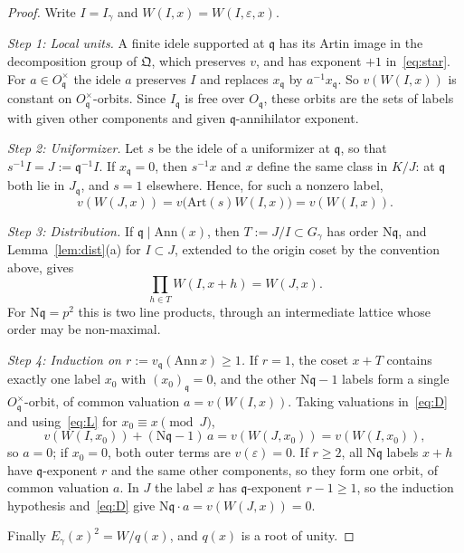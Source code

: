 \documentclass[11pt]{amsart}
\numberwithin{equation}{section}
\theoremstyle{plain}
\theoremstyle{definition}
\theoremstyle{remark}
\begin{document}
\begin{proof}
Write \(I=I_\gamma\) and \(W(I,x)=W(I,\varepsilon,x)\).

\emph{Step 1: Local units.} A finite idele supported at \(\mathfrak q\) has its Artin image in the decomposition group of \(\mathfrak Q\), which preserves \(v\), and has exponent \(+1\) in~\eqref{eq:star}. For \(a\in O_{\mathfrak q}^\times\) the idele \(a\) preserves \(I\) and replaces \(x_{\mathfrak q}\) by \(a^{-1}x_{\mathfrak q}\). So \(v(W(I,x))\) is constant on \(O_{\mathfrak q}^\times\)-orbits. Since \(I_{\mathfrak q}\) is free over \(O_{\mathfrak q}\), these orbits are the sets of labels with given other components and given \(\mathfrak q\)-annihilator exponent.

\emph{Step 2: Uniformizer.} Let \(s\) be the idele of a uniformizer at \(\mathfrak q\), so that \(s^{-1}I=J:=\mathfrak q^{-1}I\). If \(x_{\mathfrak q}=0\), then \(s^{-1}x\) and \(x\) define the same class in \(K/J\): at \(\mathfrak q\) both lie in \(J_{\mathfrak q}\), and \(s=1\) elsewhere. Hence, for such a nonzero label,
\begin{equation}\tag{L}\label{eq:L}
v(W(J,x))=v\bigl(\mathrm{Art}(s)W(I,x)\bigr)=v(W(I,x)).
\end{equation}

\emph{Step 3: Distribution.} If \(\mathfrak q\mid\mathrm{Ann}(x)\), then \(T:=J/I\subset G_\gamma\) has order \(\mathrm N\mathfrak q\), and Lemma~\ref{lem:dist}(a) for \(I\subset J\), extended to the origin coset by the convention above, gives
\begin{equation}\tag{D}\label{eq:D}
\prod_{h\in T}W(I,x+h)=W(J,x).
\end{equation}
For \(\mathrm N\mathfrak q=p^2\) this is two line products, through an intermediate lattice whose order may be non-maximal.

\emph{Step 4: Induction on \(r:=v_{\mathfrak q}(\mathrm{Ann}\,x)\ge1\).} If \(r=1\), the coset \(x+T\) contains exactly one label \(x_0\) with \((x_0)_{\mathfrak q}=0\), and the other \(\mathrm N\mathfrak q-1\) labels form a single \(O_{\mathfrak q}^\times\)-orbit, of common valuation \(a=v(W(I,x))\). Taking valuations in~\eqref{eq:D} and using~\eqref{eq:L} for \(x_0\equiv x\pmod J\),
\[v(W(I,x_0))+(\mathrm N\mathfrak q-1)\,a=v(W(J,x_0))=v(W(I,x_0)),\]
so \(a=0\); if \(x_0=0\), both outer terms are \(v(\varepsilon)=0\). If \(r\ge2\), all \(\mathrm N\mathfrak q\) labels \(x+h\) have \(\mathfrak q\)-exponent \(r\) and the same other components, so they form one orbit, of common valuation \(a\). In \(J\) the label \(x\) has \(\mathfrak q\)-exponent \(r-1\ge1\), so the induction hypothesis and~\eqref{eq:D} give \(\mathrm N\mathfrak q\cdot a=v(W(J,x))=0\).

Finally \(E_\gamma(x)^2=W/q(x)\), and \(q(x)\) is a root of unity.
\end{proof}
\end{document}
